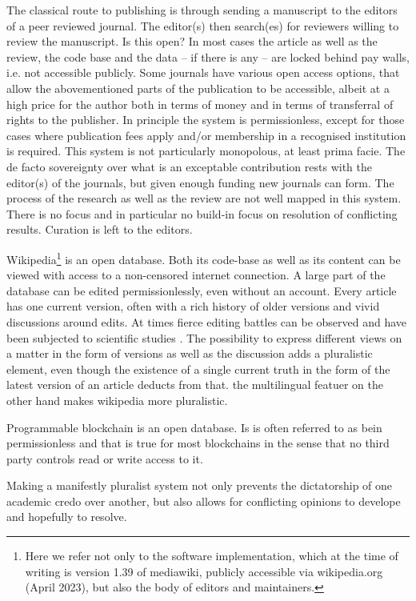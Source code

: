 \documentclass[14pt]{article}
\begin{document}
The classical route to publishing is through sending a manuscript to the editors of a peer reviewed journal. The editor(s) then search(es) for reviewers willing to review the manuscript. Is this open? In most cases the article as well as the review, the code base and the data -- if there is any --  are locked behind pay walls, i.e. not accessible publicly. Some journals have various open access options, that allow the abovementioned parts of the publication to be accessible, albeit at a high price for the author both in terms of money and in terms of transferral of rights to the publisher. In principle the system is permissionless, except for those cases where publication fees apply and/or membership in a recognised institution is required. This system is not particularly monopolous, at least prima facie. The de facto sovereignty over what is an exceptable contribution rests with the editor(s) of the journals, but given enough funding new journals can form. The process of the research as well as the review are not well mapped in this system. There is no focus and in particular no build-in focus on resolution of conflicting results. Curation is left to the editors. 

Wikipedia\footnote{Here we refer not only to the software implementation, which at the time of writing is version 1.39 of mediawiki, publicly accessible via wikipedia.org (April 2023), but also the body of editors and maintainers.} is an open database. Both its code-base as well as its content can be viewed with access to a non-censored internet connection. A large part of the database can be edited permissionlessly, even without an account. Every article has one current version, often with a rich history of older versions and vivid discussions around edits. At times fierce editing battles can be observed and have been subjected to scientific studies \cite{dedeo}. 
The possibility to express different views on a matter in the form of versions as well as the discussion adds a pluralistic element, even though the existence of a single current truth in the form of the latest version of an article deducts from that. the multilingual featuer on the other hand makes wikipedia more pluralistic. 

Programmable blockchain is an open database. Is is often referred to as bein permissionless and that is true for most blockchains in the sense that no third party controls read or write access to it.


 Making a manifestly pluralist system not only prevents the dictatorship of one academic credo over another, but also allows for conflicting opinions to develope and hopefully to resolve.
 
\end{document}
